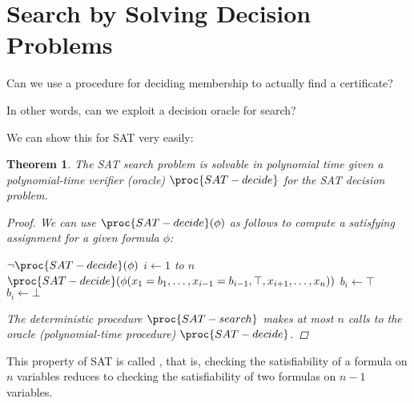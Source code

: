 \documentclass[a4paper]{report}
\newtheorem{theo}{Theorem}
\theoremstyle{definition}
\begin{document}
\section{Search by Solving Decision Problems}
Can we use a procedure for deciding membership to actually find a certificate?

In other words, can we exploit a decision oracle for search?

We can show this for SAT very easily:
\begin{theo}
The SAT search problem is solvable in polynomial time given a polynomial-time verifier (oracle) $\proc{SAT-decide}$ for the SAT decision problem.
\begin{proof}
We can use $\proc{SAT-decide}(\phi)$ as follows to compute a satisfying assignment for a given formula $\phi$:
\begin{codebox}
\li \If $\neg \proc{SAT-decide}(\phi)$
\li \Then \Return {}
\End
\li \For $i \gets 1$ to $n$ \Do
\li \If $\proc{SAT-decide}(\phi(x_1 = b_1, \dots{} , x_{i-1} = b_{i-1}, \top, x_{i+1} , \dots , x_n))$
\li \Then $b_i \gets \top$
\li \Else $b_i \gets \bot$
\End
\End
\li {}
\end{codebox}
%
The deterministic procedure $\proc{SAT-search}$ makes at most $n$ calls to the oracle (polynomial-time procedure) $\proc{SAT-decide}$.
\end{proof}
\end{theo}

This property of SAT is called , that is, checking the satisfiability of a formula on $n$ variables reduces to checking the satisfiability of two formulas on $n-1$ variables.
\end{document}
